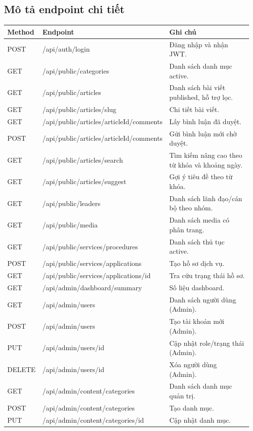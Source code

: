 \documentclass[12pt,a4paper]{article}
\begin{document}
\subsection{Mô tả endpoint chi tiết}
\begin{longtable}{p{1.8cm}p{6.2cm}p{5.2cm}}
\toprule
\textbf{Method} & \textbf{Endpoint} & \textbf{Ghi chú} \\
\midrule
POST & /api/auth/login & Đăng nhập và nhận JWT. \\
GET & /api/public/categories & Danh sách danh mục active. \\
GET & /api/public/articles & Danh sách bài viết published, hỗ trợ lọc. \\
GET & /api/public/articles/{slug} & Chi tiết bài viết. \\
GET & /api/public/articles/{articleId}/comments & Lấy bình luận đã duyệt. \\
POST & /api/public/articles/{articleId}/comments & Gửi bình luận mới chờ duyệt. \\
GET & /api/public/articles/search & Tìm kiếm nâng cao theo từ khóa và khoảng ngày. \\
GET & /api/public/articles/suggest & Gợi ý tiêu đề theo từ khóa. \\
GET & /api/public/leaders & Danh sách lãnh đạo/cán bộ theo nhóm. \\
GET & /api/public/media & Danh sách media có phân trang. \\
GET & /api/public/services/procedures & Danh sách thủ tục active. \\
POST & /api/public/services/applications & Tạo hồ sơ dịch vụ. \\
GET & /api/public/services/applications/{id} & Tra cứu trạng thái hồ sơ. \\
GET & /api/admin/dashboard/summary & Số liệu dashboard. \\
GET & /api/admin/users & Danh sách người dùng (Admin). \\
POST & /api/admin/users & Tạo tài khoản mới (Admin). \\
PUT & /api/admin/users/{id} & Cập nhật role/trạng thái (Admin). \\
DELETE & /api/admin/users/{id} & Xóa người dùng (Admin). \\
GET & /api/admin/content/categories & Danh sách danh mục quản trị. \\
POST & /api/admin/content/categories & Tạo danh mục. \\
PUT & /api/admin/content/categories/{id} & Cập nhật danh mục. \\

\end{longtable}
\end{document}

